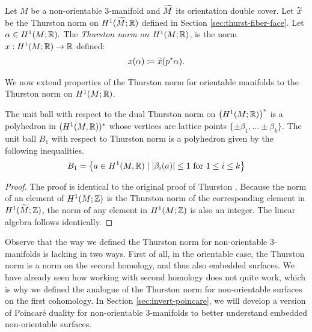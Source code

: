 Let $M$ be a non-orientable 3-manifold and $\widetilde{M}$ its orientation double cover.  Let $\widetilde{x}$ be the Thurston norm on $H^1(\widetilde{M};\mathbb{R})$ defined in Section \ref{sec:thurst-fiber-face}.
  Let $\alpha\in H^1(M;\mathbb{R}).$
  The {\it Thurston norm on $H^1(M; \mathbb{R})$}, is the norm $x: H^1(M;\mathbb{R})\rightarrow \mathbb{R}$ defined:
  \begin{align*}
    x(\alpha) \coloneqq \widetilde{x}(p^{\ast}\alpha).
  \end{align*}

We now extend properties of the Thurston norm for orientable manifolds to the Thurston norm on $H^1(M;\mathbb{R})$.
\begin{thm}
  The unit ball with respect to the dual Thurston norm on $\left( H^1(M; \mathbb{R}) \right)^{\ast}$ is a polyhedron in $(H^1(M,\mathbb{R}))^\ast$
  whose vertices are lattice points $\{\pm \beta_1, \ldots \pm \beta_k\}$. The unit ball $B_1$ with respect to
  Thurston norm is a polyhedron given by the following inequalities.
  \begin{align*}
    B_1 = \left\{ a\in H^1(M,\mathbb{R}) \mid \left| \beta_i(a) \right| \leq 1 \text{ for $1\leq i \leq k$} \right\}
  \end{align*}
\end{thm}

\begin{proof}
  The proof is identical to the original proof of Thurston
  \cite[Theorem 2]{thurston1986norm}. Because the norm of an element of
  $H^1(M; \mathbb{Z})$ is the Thurston norm of the corresponding element in $H^1(\widetilde{M}; \mathbb{Z})$, the norm of any element in
  $H^1(M; \mathbb{Z})$ is also an integer.  The linear algebra follows identically.
\end{proof}

Observe that the way we defined the Thurston norm for non-orientable $3$-manifolds is lacking in two
ways. First of all, in the orientable case, the Thurston norm is a norm on the second homology, and thus also
embedded surfaces. We have already seen how working with second homology does not quite work, which is why we defined the analogue of the Thurston norm for non-orientable surfaces on the
first cohomology. %
In Section \ref{sec:invert-poincare}, we will develop a version of Poincar\'e duality for non-orientable 3-manifolds to better understand embedded non-orientable surfaces.

